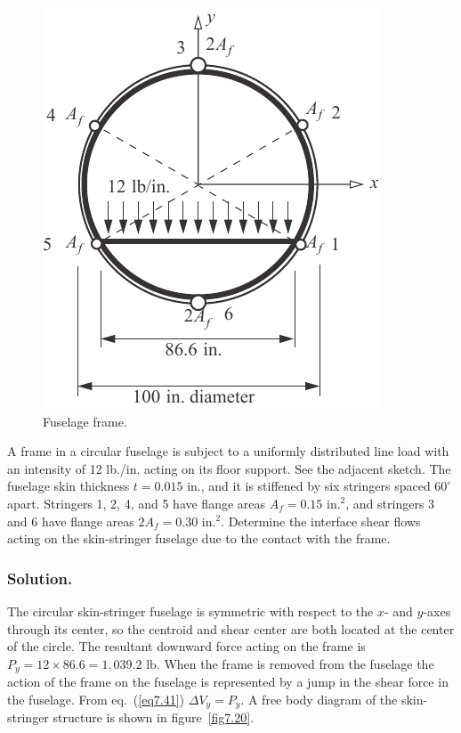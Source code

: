 \documentclass{AeroStructure-ERJohnson}
\begin{document}
\begin{example}\label{ex7.6}
\begin{figure}
\vspace{-30pt}
\includegraphics{Figure_7-19.pdf}
\caption{Fuselage frame.\label{fig7.19}}
\end{figure}
\vspace*{-2\baselineskip}

A frame in a circular fuselage is subject to a uniformly distributed line load with an intensity of 12 lb./in. acting on its floor support. See the adjacent sketch. The fuselage skin thickness $t=0.015 \textrm{ in}$., and it is stiffened by six stringers spaced $60^{\circ}$ apart. Stringers 1, 2, 4, and 5 have flange areas $A_{f}=0.15 \textrm{ in.}^{2}$, and stringers 3 and 6 have flange areas $2 A_{f}=0.30 \textrm{ in.}^{2}$. Determine the interface shear flows acting on the skin-stringer fuselage due to the contact with the frame.

\subsubsection{Solution.} The circular skin-stringer fuselage is symmetric with respect to the $x$- and $y$-axes through its center, so the centroid and shear center are both located at the center of the circle. The resultant downward force acting on the frame is $P_{y}=12 \times 86.6=1,039.2 \textrm{ lb}$. When the frame is removed from the fuselage the action of the frame on the fuselage is represented by a jump in the shear force in the fuselage. From eq.~(\ref{eq7.41}) $\Delta V_{y}=P_{y}$. A free body diagram of the skin-stringer structure is shown in figure~\ref{fig7.20}.


\end{example}
\end{document}
